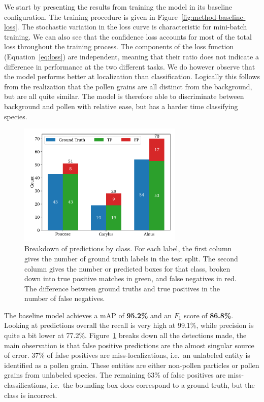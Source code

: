 We start by presenting the results from training the model in its baseline configuration. 
The training procedure is given in Figure~\ref{fig:method-baseline-loss}.
The stochastic variation in the loss curve is characteristic for mini-batch training. 
We can also see that the confidence loss accounts for most of the total loss throughout the training process.
The components of the loss function (Equation~\ref{eq:loss}) are independent, meaning that their ratio does not indicate a difference in performance at the two different tasks.
We do however observe that the model performs better at localization than classification.
Logically this follows from the realization that the pollen grains are all distinct from the background, but are all quite similar.
The model is therefore able to discriminate between background and pollen with relative ease, but has a harder time classifying species.

\begin{figure}[htbp]
    \centering
    \includegraphics[width=0.7\textwidth]{figs/results/baseline/detections_test.pdf}
    \caption[Detections by type by class for the baseline on the test split]{%
Breakdown of predictions by class.
For each label, the first column gives the number of ground truth labels in the test split.
The second column gives the number or predicted boxes for that class, broken down into true positive matches in green, and false negatives in red.
The difference between ground truths and true positives in the number of false negatives. 
    }\label{fig:results-baseline-detections}
  \end{figure}

The baseline model achieves a mAP of \textbf{95.2\%} and an \(F_1\) score of \textbf{86.8\%}.
Looking at predictions overall the recall is very high at 99.1\%, while precision is quite a bit lower at 77.2\%.
Figure~\ref{fig:results-baseline-detections} breaks down all the detections made, the main observation is that false positive predictions are the almost singular source of error.
37\% of false positives are miss-localizations, i.e.~an unlabeled entity is identified as a pollen grain.
These entities are either non-pollen particles or pollen grains from unlabeled species.
The remaining 63\% of false positives are miss-classifications, i.e.~the bounding box does correspond to a ground truth, but the class is incorrect.

